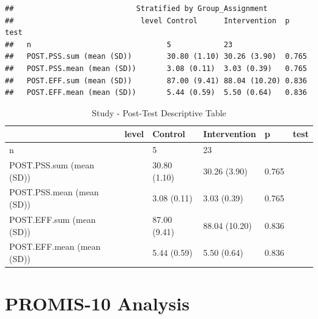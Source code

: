\documentclass[
]{article}
\begin{document}
\begin{verbatim}
##                            Stratified by Group_Assignment
##                             level Control      Intervention  p     test
##   n                               5            23                      
##   POST.PSS.sum (mean (SD))        30.80 (1.10) 30.26 (3.90)  0.765     
##   POST.PSS.mean (mean (SD))       3.08 (0.11)  3.03 (0.39)   0.765     
##   POST.EFF.sum (mean (SD))        87.00 (9.41) 88.04 (10.20) 0.836     
##   POST.EFF.mean (mean (SD))       5.44 (0.59)  5.50 (0.64)   0.836
\end{verbatim}

\begin{longtable}[t]{llllll}
\caption{\label{tab:unnamed-chunk-6}Study - Post-Test Descriptive Table}\\
\toprule
 & level & Control & Intervention & p & test\\
\midrule
n &  & 5 & 23 &  & \\
POST.PSS.sum (mean (SD)) &  & 30.80 (1.10) & 30.26 (3.90) & 0.765 & \\
POST.PSS.mean (mean (SD)) &  & 3.08 (0.11) & 3.03 (0.39) & 0.765 & \\
POST.EFF.sum (mean (SD)) &  & 87.00 (9.41) & 88.04 (10.20) & 0.836 & \\
POST.EFF.mean (mean (SD)) &  & 5.44 (0.59) & 5.50 (0.64) & 0.836 & \\
\bottomrule
\end{longtable}

\section{PROMIS-10 Analysis}\label{promis-10-analysis}
\end{document}
